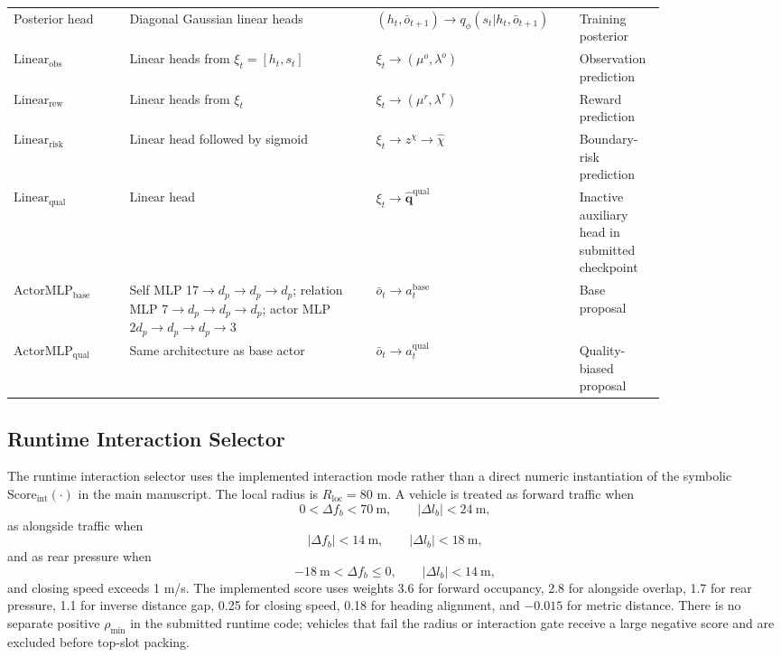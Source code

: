 \documentclass[journal]{IEEEtran}
\begin{document}
\begin{table}[t]
\begin{tabular}{p{0.16\linewidth}p{0.34\linewidth}p{0.24\linewidth}p{0.10\linewidth}}
Posterior head &
Diagonal Gaussian linear heads &
$(h_t,\bar{o}_{t+1})\rightarrow q_\phi(s_t|h_t,\bar{o}_{t+1})$ &
Training posterior \\

$\mathrm{Linear}_{\mathrm{obs}}$ &
Linear heads from $\xi_t=[h_t,s_t]$ &
$\xi_t\rightarrow(\mu^o,\lambda^o)$ &
Observation prediction \\

$\mathrm{Linear}_{\mathrm{rew}}$ &
Linear heads from $\xi_t$ &
$\xi_t\rightarrow(\mu^r,\lambda^r)$ &
Reward prediction \\

$\mathrm{Linear}_{\mathrm{risk}}$ &
Linear head followed by sigmoid &
$\xi_t\rightarrow z^\chi\rightarrow\hat\chi$ &
Boundary-risk prediction \\

$\mathrm{Linear}_{\mathrm{qual}}$ &
Linear head &
$\xi_t\rightarrow\hat{\mathbf q}^{\mathrm{qual}}$ &
Inactive auxiliary head in submitted checkpoint \\

$\mathrm{ActorMLP}_{\mathrm{base}}$ &
Self MLP 17$\rightarrow d_p\rightarrow d_p\rightarrow d_p$;
relation MLP 7$\rightarrow d_p\rightarrow d_p\rightarrow d_p$;
actor MLP $2d_p\rightarrow d_p\rightarrow d_p\rightarrow3$ &
$\bar{o}_t\rightarrow a_t^{\mathrm{base}}$ &
Base proposal \\

$\mathrm{ActorMLP}_{\mathrm{qual}}$ &
Same architecture as base actor &
$\bar{o}_t\rightarrow a_t^{\mathrm{qual}}$ &
Quality-biased proposal \\
\hline
\end{tabular}
\end{table}

\subsection{Runtime Interaction Selector}
\label{supp:selector}

The runtime interaction selector uses the implemented interaction mode
rather than a direct numeric instantiation of the symbolic
$\mathrm{Score}_{\mathrm{int}}(\cdot)$ in the main manuscript. The local
radius is $R_{\mathrm{loc}}=80$ m. A vehicle is treated as forward
traffic when
\[
0<\Delta f_b<70~\mathrm{m},
\qquad
|\Delta l_b|<24~\mathrm{m},
\]
as alongside traffic when
\[
|\Delta f_b|<14~\mathrm{m},
\qquad
|\Delta l_b|<18~\mathrm{m},
\]
and as rear pressure when
\[
-18~\mathrm{m}<\Delta f_b\le0,
\qquad
|\Delta l_b|<14~\mathrm{m},
\]
and closing speed exceeds 1 m/s. The implemented score uses weights
3.6 for forward occupancy, 2.8 for alongside overlap, 1.7 for rear
pressure, 1.1 for inverse distance gap, 0.25 for closing speed, 0.18
for heading alignment, and $-0.015$ for metric distance. There is no
separate positive $\rho_{\min}$ in the submitted runtime code; vehicles
that fail the radius or interaction gate receive a large negative score
and are excluded before top-slot packing.
\end{document}
